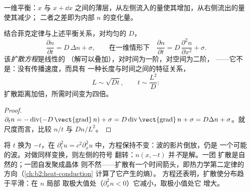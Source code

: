 \begin{omfigure}

{\small 一维平衡：$x$ 与 $x + \dd
x$ 之间的薄层，从左侧流入的量使其增加，从右侧流出的量使其减少；
二者之差即为内部 $n$ 的变化量。}
\end{omfigure}

\begin{theorem}[扩散方程]\label{thm:b2:particle-diffusion:equation}
结合菲克定律与上述平衡关系，对均匀的 $D$，
\[
\frac{\partial n}{\partial t} = D\,\Delta n + \sigma ,
\qquad\text{在一维情形下}\quad
\frac{\partial n}{\partial t} = D\,\frac{\partial^2 n}{\partial x^2} + \sigma .
\]
该\emph{扩散方程}是线性的
（解可以叠加），对时间为一阶，对空间为二阶，
——它不是：没有传播速度，而具有
一种长度与时间之间的特征关系，
\[
L \sim \sqrt{D t}, \qquad t \sim \frac{L^2}{D} :
\]
扩散距离加倍，所需时间变为四倍。
\end{theorem}

\begin{proof}
$\partial_t n = -\operatorname{div}(-D\,\vect{\operatorname{grad}}\,n) +
\sigma = D\operatorname{div}\vect{\operatorname{grad}}\,n + \sigma = D\Delta
n + \sigma$。就尺度而言，比较 $n/t$ 与 $Dn/L^2$。
\end{proof}

\begin{remark}[扩散是不可逆的]\label{rem:b2:particle-diffusion:irreversible}
将 $t$ 换为 $-t$，在 $\partial_t^2 u = c^2
\partial_x^2 u$ 中，方程保持不变：波的影片倒放，仍是
一个可能的波。对做同样变换，则左侧的符号
翻转：$n(x,-t)$ 并\emph{不}是解。一团
扩散是自然的；一团自发聚成晶体
则不然——扩散有一个时间箭头，即热力学第二定律的
方向（\cref{ch:b2:heat-conduction} 计算了它产生的熵）。
方程还表明，扩散使分布趋于平滑：在 $n$ 局部
取极大值处（$\partial_x^2 n < 0$）它减小，取极小值处它
增大。
\end{remark}

